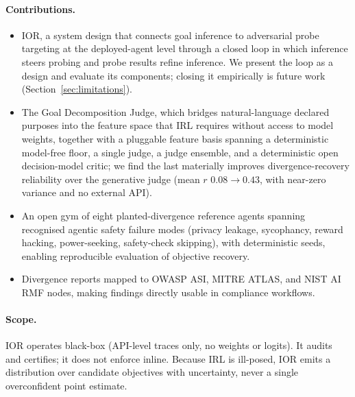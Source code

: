 \paragraph{Contributions.}
\begin{itemize}[leftmargin=1.4em]
  \item IOR, a system design that connects goal inference to adversarial probe
  targeting at the deployed-agent level through a closed loop in which inference
  steers probing and probe results refine inference. We present the loop as a
  design and evaluate its components; closing it empirically is future work
  (Section~\ref{sec:limitations}).
  \item The Goal Decomposition Judge, which bridges natural-language declared
  purposes into the feature space that IRL requires without access to model
  weights, together with a pluggable feature basis spanning a deterministic
  model-free floor, a single judge, a judge ensemble, and a deterministic open
  decision-model critic; we find the last materially improves divergence-recovery
  reliability over the generative judge (mean $r$ $0.08 \to 0.43$, with near-zero
  variance and no external API).
  \item An open gym of eight planted-divergence reference agents spanning recognised
  agentic safety failure modes (privacy leakage, sycophancy, reward hacking,
  power-seeking, safety-check skipping), with deterministic
  seeds, enabling reproducible evaluation of objective recovery.
  \item Divergence reports mapped to OWASP ASI, MITRE ATLAS, and NIST AI RMF nodes,
  making findings directly usable in compliance workflows.
\end{itemize}

\paragraph{Scope.}
IOR operates black-box (API-level traces only, no weights or logits). It audits and
certifies; it does not enforce inline. Because IRL is ill-posed, IOR emits a
distribution over candidate objectives with uncertainty, never a single
overconfident point estimate.
